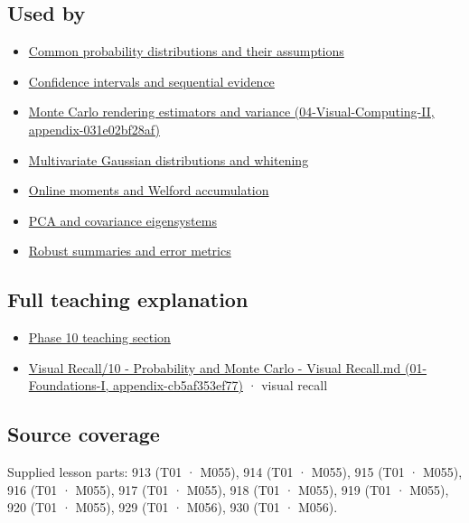 \subsection{Used by}\label{used-by}

\begin{itemize}
\tightlist
\item
  \hyperref[appendix-a2360b435383]{Common probability distributions and their assumptions}
\item
  \hyperref[appendix-c83016554b1e]{Confidence intervals and sequential evidence}
\item
  \href{}{Monte Carlo rendering estimators and variance (04-Visual-Computing-II, appendix-031e02bf28af)}
\item
  \hyperref[appendix-12bbe185dbe5]{Multivariate Gaussian distributions and whitening}
\item
  \hyperref[appendix-33237f0f618b]{Online moments and Welford accumulation}
\item
  \hyperref[appendix-ad175ef3c5bf]{PCA and covariance eigensystems}
\item
  \hyperref[appendix-bcc44e9d3d02]{Robust summaries and error metrics}
\end{itemize}

\subsection{Full teaching explanation}\label{full-teaching-explanation}

\begin{itemize}
\tightlist
\item
  \href{Continuous\%20Notes/Computing\%20Foundations\%20-\%20From\%20Bits\%20to\%20C++\%20and\%20Systems\%20APIs\#3.\%20Expected\%20values\%20describe\%20centers;\%20covariance\%20describes\%20dependence}{Phase 10 teaching section}
\item
  \href{}{Visual Recall/10 - Probability and Monte Carlo - Visual Recall.md (01-Foundations-I, appendix-cb5af353ef77)} · visual recall
\end{itemize}

\subsection{Source coverage}\label{source-coverage}

Supplied lesson parts: 913 (T01 · M055), 914 (T01 · M055), 915 (T01 · M055), 916 (T01 · M055), 917 (T01 · M055), 918 (T01 · M055), 919 (T01 · M055), 920 (T01 · M055), 929 (T01 · M056), 930 (T01 · M056).
